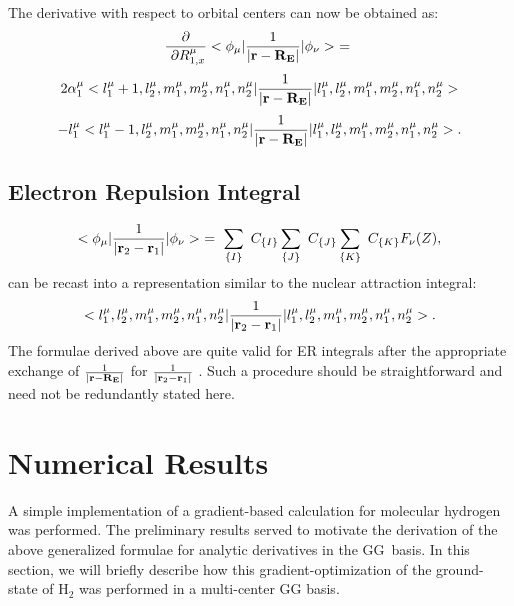 The derivative with respect to orbital centers can now be obtained as: 
\[
{\frac \partial {{\ \partial R_{1,x}^\mu }}}<\phi _\mu |{\frac 1{|{\bf r}-%
{\bf R_E}|}}|\phi _\nu >\ =\ 
\]
\[
2\alpha _1^\mu <l_1^\mu +1,l_2^\mu ,m_1^\mu ,m_2^\mu ,n_1^\mu ,n_2^\mu |{%
\frac 1{|{\bf r}-{\bf R_E}|}}|l_1^\mu ,l_2^\mu ,m_1^\mu ,m_2^\mu ,n_1^\mu
,n_2^\mu >
\]
\begin{equation}
-l_1^\mu <l_1^\mu -1,l_2^\mu ,m_1^\mu ,m_2^\mu ,n_1^\mu ,n_2^\mu |{\frac 1{|%
{\bf r}-{\bf R_E}|}}|l_1^\mu ,l_2^\mu ,m_1^\mu ,m_2^\mu ,n_1^\mu ,n_2^\mu >.
\end{equation}

\subsection{Electron Repulsion Integral}

\begin{equation}
<\phi _\mu |{\frac 1{|{\bf r}_2-{\bf r}_1|}}|\phi _\nu >\ =\ \sum_{\{I\}}\
C_{\{I\}}\sum_{\{J\}}\ C_{\{J\}}\sum_{\{K\}}\ C_{\{K\}}F_\nu (Z),
\end{equation}
can be recast into a representation similar to the nuclear attraction
integral: 
\begin{equation}
<l_1^\mu ,l_2^\mu ,m_1^\mu ,m_2^\mu ,n_1^\mu ,n_2^\mu |{\frac 1{|{\bf r}_2-%
{\bf r}_1|}}|l_1^\mu ,l_2^\mu ,m_1^\mu ,m_2^\mu ,n_1^\mu ,n_2^\mu >.
\end{equation}
The formulae derived above are quite valid for ER integrals after the
appropriate exchange of ${\frac 1{|{\bf r}-{\bf R_E}|}}$ for ${\frac 1{|{\bf %
r}_2-{\bf r}_1|}}$ . Such a procedure should be straightforward and need not
be redundantly stated here.

\section{Numerical Results}

A simple implementation of a gradient-based calculation for molecular
hydrogen was performed. The preliminary results served to motivate the
derivation of the above generalized formulae for analytic derivatives in the
GG\ basis. In this section, we will briefly describe how this
gradient-optimization of the ground-state of H$_2$ was performed in a
multi-center GG basis.

